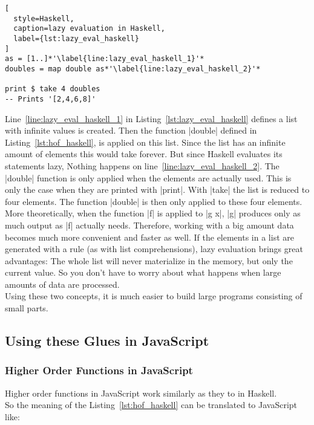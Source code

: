 \begin{lstlisting}[
  style=Haskell,
  caption=lazy evaluation in Haskell,
  label={lst:lazy_eval_haskell}
]
as = [1..]*'\label{line:lazy_eval_haskell_1}'*
doubles = map double as*'\label{line:lazy_eval_haskell_2}'*

print $ take 4 doubles 
-- Prints '[2,4,6,8]'
\end{lstlisting}

Line~\ref{line:lazy_eval_haskell_1} in Listing~\ref{lst:lazy_eval_haskell}
defines a list with infinite values is created. Then the function |double|
defined in Listing~\ref{lst:hof_haskell}, is applied on this list. Since the
list has an infinite amount of elements this would take forever. But since
Haskell evaluates its statements lazy, Nothing happens on
line~\ref{line:lazy_eval_haskell_2}. The |double| function is only applied when
the elements are actually used. This is only the case when they are printed
with |print|. With |take| the list is reduced to four elements. The function
|double| is then only applied to these four elements. \\ More theoretically,
when the function |f| is applied to |g x|, |g| produces only as much output as
|f| actually needs. Therefore, working with a big amount data becomes much more
convenient and faster as well. If the elements in a list are generated with a
rule (as with list comprehensions), lazy evaluation brings great advantages:
The whole list will never materialize in the memory, but only the current
value. So you don't have to worry about what happens when large amounts of data
are processed. \\ Using these two concepts, it is much easier to build large
programs consisting of small parts.

\subsection{Using these Glues in JavaScript} %
\label{sub:Using these Glues in JavaScript}

\subsubsection{Higher Order Functions in JavaScript} %
\label{subsub:Higher Order Functions in JavaScript}
Higher order functions in JavaScript work similarly as they to in Haskell. \\
So the meaning of the Listing~\ref{lst:hof_haskell} can be translated to 
JavaScript like:

